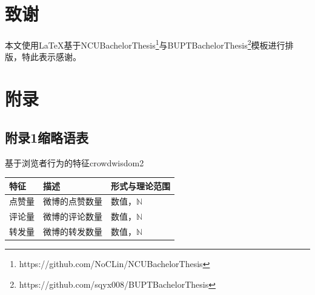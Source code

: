 \documentclass[a4paper,AutoFakeBold,oneside,12pt]{book}
\begin{document}
\clearpage{}
\chapter*{致\qquad{}谢}
\normalsize

{
本文使用\LaTeX{}基于NCUBachelorThesis\footnote{https://github.com/NoCLin/NCUBachelorThesis}与BUPTBachelorThesis\footnote{https://github.com/sqyx008/BUPTBachelorThesis}模板进行排版，特此表示感谢。
}

\setcounter{figure}{0} 
\renewcommand{\thefigure}{~附-\arabic{figure}~}
\setcounter{equation}{0} 
\renewcommand{\theequation}{~附-\arabic{equation}~}
\setcounter{table}{0} 
\renewcommand{\thetable}{~附-\arabic{table}~}
\setcounter{lstlisting}{0} 
\makeatletter
  \renewcommand \thelstlisting
       {附-\@arabic\c@lstlisting}
\makeatother


\chapter*{附\qquad{}录}

{}
\section*{附录1\quad{}缩略语表}

\begin{bupttable}{基于浏览者行为的特征}{crowdwisdom2}
    \begin{tabular}{l|l|l}
        \hline \textbf{特征} & \textbf{描述} & \textbf{形式与理论范围}\\
        \hline 点赞量 & 微博的点赞数量 & 数值，$\mathbb{N}$ \\
        \hline 评论量 & 微博的评论数量 & 数值，$\mathbb{N}$ \\
        \hline 转发量 & 微博的转发数量 & 数值，$\mathbb{N}$ \\
        \hline
    \end{tabular}
\end{bupttable}
\end{document}
